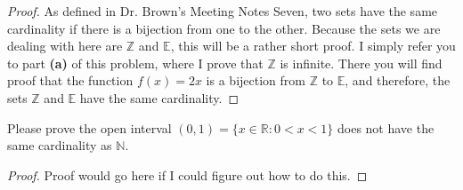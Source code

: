 \documentclass[12pt]{article}
\newenvironment{problem}[2][Problem]{\begin{trivlist}
\item[\hskip \labelsep {\bfseries #1}\hskip \labelsep {\bfseries #2.}]}{\end{trivlist}}
\begin{document}
\begin{proof}
As defined in Dr. Brown's Meeting Notes Seven, two sets have the same cardinality if there is a bijection from one to the other. Because the sets we are dealing with here are $\mathbb{Z}$ and $\mathbb{E}$, this will be a rather short proof. I simply refer you to part \textbf{(a)} of this problem, where I prove that $\mathbb{Z}$ is infinite. There you will find proof that the function $f(x)=2x$ is a bijection from $\mathbb{Z}$ to $\mathbb{E}$, and therefore, the sets $\mathbb{Z}$ and $\mathbb{E}$ have the same cardinality. 
\end{proof}

\begin{problem}{3}
Please prove the open interval $(0,1) = \{x \in\mathbb{R} : 0 < x < 1\}$ does not have the same cardinality as $\mathbb{N}$.
\end{problem}
 
\begin{proof}
Proof would go here if I could figure out how to do this.
\end{proof}
\end{document}
